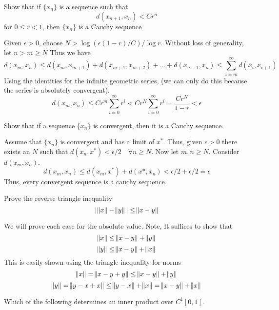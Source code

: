 \documentclass{homework}
\begin{document}
\begin{problem}[2-20]
  Show that if $\{x_n\}$ is a sequence such that 
  \[ d(x_{n+1}, x_n) < Cr^n\]
  for $0 \leq r < 1$, then $\{x_n\}$ is a Cauchy sequence
\end{problem}

\begin{solution}
  Given $\epsilon > 0$, choose $N > \log{(\epsilon(1-r)/C)}/\log{r}$. Without loss of generality, let $n > m \geq N$ Thus we have
  \[d(x_m, x_n) \leq d(x_m, x_{m+1}) + d(x_{m+1}, x_{m+2}) + \dots + d(x_{n-1}, x_{n}) \leq \sum_{i = m}^{\infty} d(x_{i}, x_{i+1})\]
  Using the identities for the infinite geometric series, (we can only do this because the series is absolutely convergent).
  \[d(x_m, x_n) \leq Cr^m\sum_{i=0}^{\infty} r^i < Cr^N\sum_{i=0}^{\infty} r^i = \frac{Cr^N}{1 - r} < \epsilon \]
  
\end{solution}

\begin{problem}[2-22]
  Show that if a sequence $\{x_n\}$ is convergent, then it is a Cauchy sequence.
\end{problem}

\begin{solution}
  Assume that $\{x_n\}$ is convergent and has a limit of $x^*$. Thus, given $\epsilon > 0$ there exists an $N$ such that $d(x_n, x^*) < \epsilon/2 \quad \forall n \geq N$. Now let $m,n \geq N$. Consider $d(x_m, x_n)$.
  \[d(x_m, x_n) \leq d(x_m, x^*) + d(x*,x_n) < \epsilon/2 + \epsilon/2 = \epsilon\]
Thus, every convergent sequence is a cauchy sequence.
\end{solution}

\begin{problem}[2-33]
  Prove the reverse triangle inequality
  \[|\norm{x} - \norm{y}| \leq \norm{x-y}\]
\end{problem}

\begin{solution}
  We will prove each case for the absolute value. Note, It suffices to show that 
  \[\norm{x} \leq \norm{x - y} + \norm{y}\]
  \[\norm{y} \leq \norm{x - y} + \norm{x}\]
  This is easily shown using the triangle inequality for norms
  \[\norm{x} = \norm{x - y + y} \leq \norm{x - y} + \norm{y}\]
  \[\norm{y} = \norm{y - x + x} \leq \norm{y - x} + \norm{x} = \norm{x - y} + \norm{x}\]
\end{solution}

\begin{problem}[2-42]
  Which of the following determines an inner product over $C^1[0,1]$.
  \begin{parts}
    \part
    \[\langle f, g \rangle = \int_0^1 f'(t)g'(t)\ dt + f(0)g(0)\]
    \part
    \[\langle f, g \rangle = \int_0^1 f'(t)g'(t)\ dt\]
  \end{parts}
\end{problem}
\end{document}
